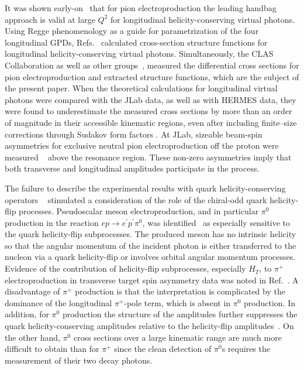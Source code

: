 \documentclass[prc,floatfix,twocolumn,superscriptaddress,letter]{revtex4}
\begin{document}
It was shown early-on~\cite{eides-98} that for  pion electroproduction the leading handbag approach  is valid at large $Q^2$ for longitudinal helicity-conserving virtual photons. Using Regge phenomenology as a guide for parametrization of the four longitudinal GPDs, Refs.~\cite{Kroll-Huang, G-K-09} calculated cross-section structure functions for longitudinal helicity-conserving virtual photons. Simultaneously, the CLAS Collaboration as well as other groups~\cite{bedlinskiy,Hall-A-pi0, hermes-transverse}, measured the differential cross sections for pion electroproduction and extracted structure functions, which are the subject of the present paper.
When the theoretical calculations for longitudinal virtual photons were compared with the JLab data, as well as with HERMES data,  they were  found  to  underestimate the measured cross sections by more than an order of magnitude in their accessible kinematic regions, even after including  finite--size  corrections through Sudakov form factors
\cite{G-K-09} . At JLab, sizeable beam-spin asymmetries for exclusive neutral pion electroproduction off the proton were  measured ~\cite{demasi} above the resonance region. These non-zero asymmetries imply that both transverse and longitudinal amplitudes participate in the process.

The failure to describe the experimental results with quark helicity-conserving operators ~\cite{polyakov, Kroll-Huang} stimulated a consideration of the role of the  chiral-odd quark helicity-flip processes. Pseudoscalar meson electroproduction, and in particular $\pi^0$ production in the reaction $ep\to e^\prime p^\prime \pi^0$, was 
identified~\cite{Ahmad:2008hp,G-K-09,G-K-11} 
as especially sensitive to the quark helicity-flip subprocesses. The produced meson has no intrinsic helicity so that the angular momentum of the incident photon is either transferred to the nucleon via a quark helicity-flip or involves  orbital angular momentum processes. %
Evidence of the contribution of helicity-flip subprocesses, especially  $H_T$,   to $\pi^+$ electroproduction in transverse target spin asymmetry data  \cite{hermes-transverse} was noted in Ref.~\cite{G-K-09}.  A disadvantage of   
$\pi^+$ production is that the interpretation is complicated by the dominance  of the longitudinal $\pi^+$-pole term, which is absent in $\pi^0$ production. 
 In addition, for $\pi^0$ production the structure of the amplitudes further suppresses the quark helicity-conserving amplitudes relative to the  helicity-flip  
 amplitudes~\cite{G-K-09}.  On the other hand, 
$\pi^0$ cross sections  over a large kinematic range are much more difficult to obtain than for  $\pi^+$ since the clean detection of $\pi^0$s requires the measurement of their two decay photons.  
\end{document}
